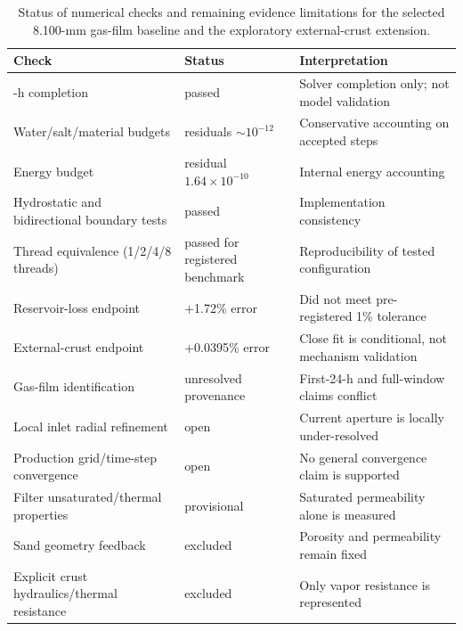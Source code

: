 \documentclass[draft,wrr]{agutexSI2019}
\begin{document}
\begin{table}
\caption{Status of numerical checks and remaining evidence limitations for the
selected 8.100-mm gas-film baseline and the exploratory external-crust extension.}
\label{tab:si-verification}
\centering
\small
\begin{tabular}{>{\raggedright\arraybackslash}p{}
                >{\raggedright\arraybackslash}p{}
                >{\raggedright\arraybackslash}p{}}
\toprule
Check & Status & Interpretation \\
\midrule
174-h completion & passed & Solver completion only; not model validation \\
Water/salt/material budgets & residuals $\sim10^{-12}$ & Conservative accounting on accepted steps \\
Energy budget & residual $1.64\times10^{-10}$ & Internal energy accounting \\
Hydrostatic and bidirectional boundary tests & passed & Implementation consistency \\
Thread equivalence (1/2/4/8 threads) & passed for registered benchmark & Reproducibility of tested configuration \\
Reservoir-loss endpoint & +1.72\% error & Did not meet pre-registered 1\% tolerance \\
External-crust endpoint & +0.0395\% error & Close fit is conditional, not mechanism validation \\
Gas-film identification & unresolved provenance & First-24-h and full-window claims conflict \\
Local inlet radial refinement & open & Current aperture is locally under-resolved \\
Production grid/time-step convergence & open & No general convergence claim is supported \\
Filter unsaturated/thermal properties & provisional & Saturated permeability alone is measured \\
Sand geometry feedback & excluded & Porosity and permeability remain fixed \\
Explicit crust hydraulics/thermal resistance & excluded & Only vapor resistance is represented \\
\bottomrule
\end{tabular}
\end{table}
\end{document}
